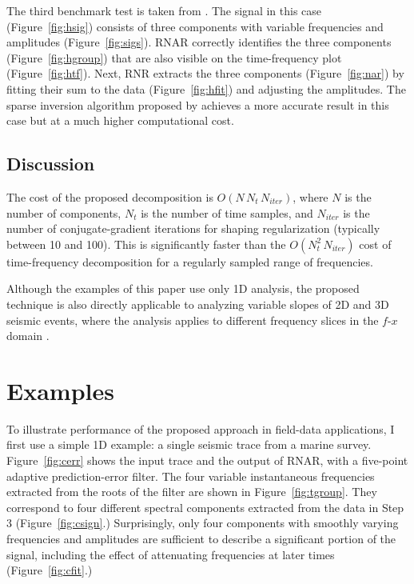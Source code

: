 The third benchmark test is taken from \cite{hou2}. The signal in this
case (Figure~\ref{fig:hsig}) consists of three components with
variable frequencies and amplitudes (Figure~\ref{fig:sigs}). RNAR
correctly identifies the three components (Figure~\ref{fig:hgroup}) that
are also visible on the time-frequency plot
(Figure~\ref{fig:htf}). Next, RNR extracts the three components
(Figure~\ref{fig:nar}) by fitting their sum to the data
(Figure~\ref{fig:hfit}) and adjusting the amplitudes. The sparse
inversion algorithm proposed by \cite{hou2} achieves a more accurate
result in this case but at a much higher computational cost.

\subsection{Discussion}

The cost of the proposed decomposition is
$O\left(N\,N_t\,N_{iter}\right)$, where $N$ is the number of
components, $N_t$ is the number of time samples, and $N_{iter}$ is the
number of conjugate-gradient iterations for
shaping regularization (typically between 10 and 100). This is
significantly faster than the $O\left(N_t^2\,N_{iter}\right)$ cost of
time-frequency decomposition for a regularly sampled range of
frequencies.

Although the examples of this paper use only 1D analysis, the
proposed technique is also directly applicable to analyzing variable
slopes of 2D and 3D seismic events, where the analysis applies to
different frequency slices in the $f$-$x$ domain
\cite[]{SEG-1984-S10.1,TLE18-01-00550058,SEG-2000-19691972,guochang,guochang2}.

\section{Examples}

To illustrate performance of the proposed approach in field-data
applications, I first use a simple 1D example: a single seismic
trace from a marine survey. Figure~\ref{fig:cerr} shows the input
trace and the output of RNAR, with a five-point adaptive
prediction-error filter. The four variable instantaneous frequencies
extracted from the roots of the filter are shown in
Figure~\ref{fig:tgroup}. They correspond to four different spectral
components extracted from the data in Step 3 (Figure~\ref{fig:csign}.)
Surprisingly, only four components with smoothly varying frequencies
and amplitudes are sufficient to describe a
significant portion of the signal, including the
effect of attenuating frequencies at later times
(Figure~\ref{fig:cfit}.)

